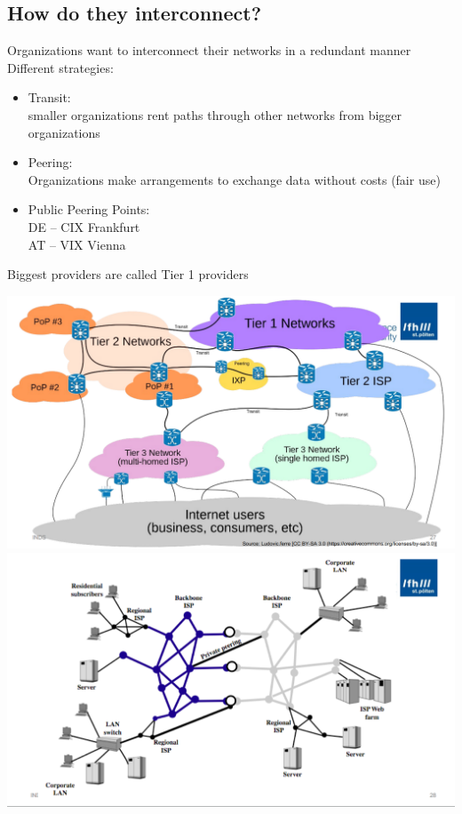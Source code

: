 \documentclass[11pt]{article}
\begin{document}
\subsection{How do they interconnect?}
Organizations want to interconnect their networks in a redundant manner
Different strategies:
    \begin{itemize}
        \item Transit: \\
        smaller organizations rent paths through other networks from bigger organizations
        \item Peering: \\
        Organizations make arrangements to exchange data without costs (fair use)
        \item Public Peering Points: \\
        DE – CIX Frankfurt \\
        AT – VIX Vienna 
    \end{itemize}
Biggest providers are called Tier 1 providers

\includegraphics[width=\textwidth]{internet-interconnect}
\includegraphics[width=\textwidth]{internet-interconnect-2}
\end{document}
